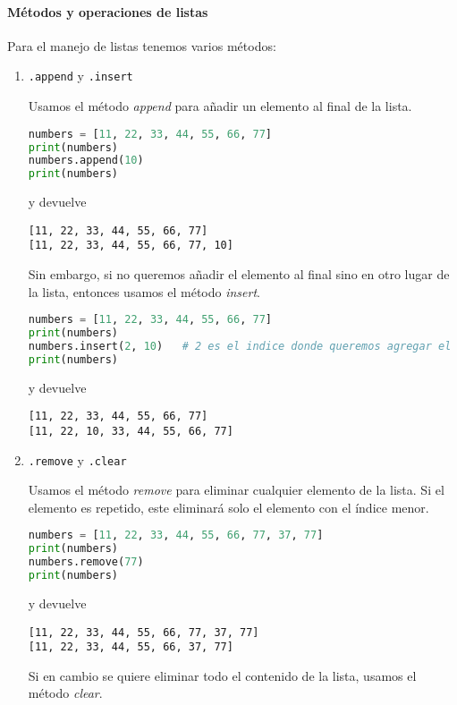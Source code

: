     \paragraph{Métodos y operaciones de listas} Para el manejo de listas tenemos varios métodos:
    \begin{enumerate}
        \item \texttt{.append} y \texttt{.insert}\par 
        Usamos el método \emph{append} para añadir un elemento al final de la lista.
        \begin{lstlisting}[language={python}]
numbers = [11, 22, 33, 44, 55, 66, 77]
print(numbers)
numbers.append(10)
print(numbers)
        \end{lstlisting}
        y devuelve
        \begin{lstlisting}[language={[latex]tex}]
[11, 22, 33, 44, 55, 66, 77]
[11, 22, 33, 44, 55, 66, 77, 10]
        \end{lstlisting}
        Sin embargo, si no queremos añadir el elemento al final sino en otro lugar de la lista, entonces usamos el método \emph{insert}. 
        \begin{lstlisting}[language={python}]
numbers = [11, 22, 33, 44, 55, 66, 77]
print(numbers)
numbers.insert(2, 10)   # 2 es el indice donde queremos agregar el elemento 10
print(numbers)
        \end{lstlisting}
        y devuelve
        \begin{lstlisting}[language={[latex]tex}]
[11, 22, 33, 44, 55, 66, 77]
[11, 22, 10, 33, 44, 55, 66, 77]
        \end{lstlisting}
        \item \texttt{.remove} y \texttt{.clear}\par 
        Usamos el método \emph{remove} para eliminar cualquier elemento de la lista. Si el elemento es repetido, este eliminará solo el elemento con el índice menor.
        \begin{lstlisting}[language={python}]
numbers = [11, 22, 33, 44, 55, 66, 77, 37, 77]
print(numbers)
numbers.remove(77)
print(numbers)
        \end{lstlisting}
        y devuelve
        \begin{lstlisting}[language={[latex]tex}]
[11, 22, 33, 44, 55, 66, 77, 37, 77]
[11, 22, 33, 44, 55, 66, 37, 77]
        \end{lstlisting}
        Si en cambio se quiere eliminar todo el contenido de la lista, usamos el método \emph{clear}.
        \begin{lstlisting}[language={python}]

\end{lstlisting}
\end{enumerate}
